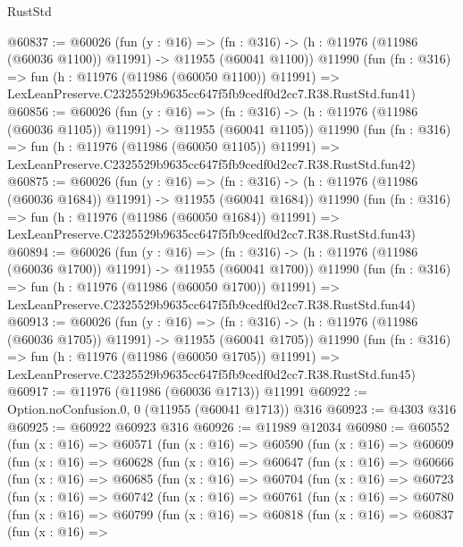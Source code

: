\begin{lexlean}{RustStd}
\begin{coremodule}
@60837 := @60026
    (fun (y : @16) =>
    (fn : @316) -> (h : @11976 (@11986 (@60036 @1100)) @11991) -> @11955 (@60041 @1100))
    @11990
    (fun (fn : @316) =>
    fun (h : @11976 (@11986 (@60050 @1100)) @11991) =>
    LexLeanPreserve.C2325529b9635cc647f5fb9cedf0d2cc7.R38.RustStd.fun41)
@60856 := @60026
    (fun (y : @16) =>
    (fn : @316) -> (h : @11976 (@11986 (@60036 @1105)) @11991) -> @11955 (@60041 @1105))
    @11990
    (fun (fn : @316) =>
    fun (h : @11976 (@11986 (@60050 @1105)) @11991) =>
    LexLeanPreserve.C2325529b9635cc647f5fb9cedf0d2cc7.R38.RustStd.fun42)
@60875 := @60026
    (fun (y : @16) =>
    (fn : @316) -> (h : @11976 (@11986 (@60036 @1684)) @11991) -> @11955 (@60041 @1684))
    @11990
    (fun (fn : @316) =>
    fun (h : @11976 (@11986 (@60050 @1684)) @11991) =>
    LexLeanPreserve.C2325529b9635cc647f5fb9cedf0d2cc7.R38.RustStd.fun43)
@60894 := @60026
    (fun (y : @16) =>
    (fn : @316) -> (h : @11976 (@11986 (@60036 @1700)) @11991) -> @11955 (@60041 @1700))
    @11990
    (fun (fn : @316) =>
    fun (h : @11976 (@11986 (@60050 @1700)) @11991) =>
    LexLeanPreserve.C2325529b9635cc647f5fb9cedf0d2cc7.R38.RustStd.fun44)
@60913 := @60026
    (fun (y : @16) =>
    (fn : @316) -> (h : @11976 (@11986 (@60036 @1705)) @11991) -> @11955 (@60041 @1705))
    @11990
    (fun (fn : @316) =>
    fun (h : @11976 (@11986 (@60050 @1705)) @11991) =>
    LexLeanPreserve.C2325529b9635cc647f5fb9cedf0d2cc7.R38.RustStd.fun45)
@60917 := @11976 (@11986 (@60036 @1713)) @11991
@60922 := Option.noConfusion.{0, 0} (@11955 (@60041 @1713)) @316
@60923 := @4303 @316
@60925 := @60922 @60923 @316
@60926 := @11989 @12034
@60980 := @60552
    (fun (x : @16) =>
    @60571
      (fun (x : @16) =>
      @60590
        (fun (x : @16) =>
        @60609
          (fun (x : @16) =>
          @60628
            (fun (x : @16) =>
            @60647
              (fun (x : @16) =>
              @60666
                (fun (x : @16) =>
                @60685
                  (fun (x : @16) =>
                  @60704
                    (fun (x : @16) =>
                    @60723
                      (fun (x : @16) =>
                      @60742
                        (fun (x : @16) =>
                        @60761
                          (fun (x : @16) =>
                          @60780
                            (fun (x : @16) =>
                            @60799
                              (fun (x : @16) =>
                              @60818
                                (fun (x : @16) =>
                                @60837
                                  (fun (x : @16) =>

\end{coremodule}
\end{lexlean}
